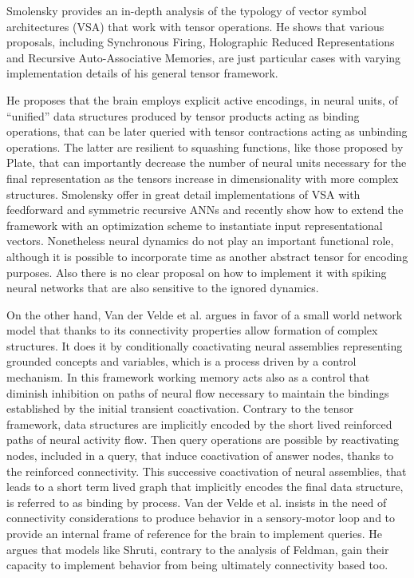 \documentclass[10pt]{article}
\begin{document}
Smolensky provides an in-depth analysis of the typology of vector symbol architectures (VSA) that work with tensor operations.
He shows that various proposals, including Synchronous Firing\cite{Shastri_1993}, Holographic Reduced Representations\cite{Plate_1995} and Recursive Auto-Associative Memories\cite{Chalmers_1992}, are just particular cases with varying implementation details of his general tensor framework.

He proposes that the brain employs explicit active encodings, in neural units, of ``unified'' data structures produced by tensor products acting as binding operations, that can be later queried with tensor contractions acting as unbinding operations.
The latter are resilient to squashing functions, like those proposed by Plate, that can importantly decrease the number of neural units necessary for the final representation as the tensors increase in dimensionality with more complex structures.
Smolensky offer in great detail implementations of VSA with feedforward and symmetric recursive ANNs\cite{smolensky2006harmonic} and recently show how to extend the framework with an optimization scheme to instantiate input representational vectors\cite{Smolensky_2013}.
Nonetheless neural dynamics do not play an important functional role, although it is possible to incorporate time as another abstract tensor for encoding purposes.
Also there is no clear proposal on how to implement it with spiking neural networks that are also sensitive to the ignored dynamics.

On the other hand, Van der Velde et al.\cite{van_der_Velde_2015} argues in favor of a small world network model that thanks to its connectivity properties allow formation of complex structures.
It does it by conditionally coactivating neural assemblies representing grounded concepts and variables, which is a process driven by a control mechanism.
In this framework working memory acts also as a control that diminish inhibition on paths of neural flow necessary to maintain the bindings established by the initial transient coactivation.
Contrary to the tensor framework, data structures are implicitly encoded by the short lived reinforced paths of neural activity flow.
Then query operations are possible by reactivating nodes, included in a query, that induce coactivation of answer nodes, thanks to the reinforced connectivity.
This successive coactivation of neural assemblies, that leads to a short term lived graph that implicitly encodes the final data structure, is referred to as binding by process.
Van der Velde et al. insists in the need of connectivity considerations to produce behavior in a sensory-motor loop and to provide an internal frame of reference for the brain to implement queries.
He argues that models like Shruti\cite{Shastri_1993}, contrary to the analysis of Feldman\cite{Feldman_2012}, gain their capacity to implement behavior from being ultimately connectivity based too.
\end{document}
